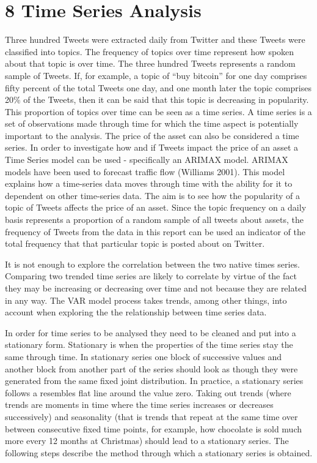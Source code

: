 \documentclass[
]{article}
\begin{document}
\hypertarget{time-series-analysis}{%
\section{8 Time Series Analysis}\label{time-series-analysis}}

Three hundred Tweets were extracted daily from Twitter and these Tweets
were classified into topics. The frequency of topics over time represent
how spoken about that topic is over time. The three hundred Tweets
represents a random sample of Tweets. If, for example, a topic of ``buy
bitcoin'' for one day comprises fifty percent of the total Tweets one
day, and one month later the topic comprises 20\% of the Tweets, then it
can be said that this topic is decreasing in popularity. This proportion
of topics over time can be seen as a time series. A time series is a set
of observations made through time for which the time aspect is
potentially important to the analysis. The price of the asset can also
be considered a time series. In order to investigate how and if Tweets
impact the price of an asset a Time Series model can be used -
specifically an ARIMAX model. ARIMAX models have been used to forecast
traffic flow (Williams 2001). This model explains how a time-series data
moves through time with the ability for it to dependent on other
time-series data. The aim is to see how the popularity of a topic of
Tweets affects the price of an asset. Since the topic frequency on a
daily basis represents a proportion of a random sample of all tweets
about assets, the frequency of Tweets from the data in this report can
be used an indicator of the total frequency that that particular topic
is posted about on Twitter.

It is not enough to explore the correlation between the two native times
series. Comparing two trended time series are likely to correlate by
virtue of the fact they may be increasing or decreasing over time and
not because they are related in any way. The VAR model process takes
trends, among other things, into account when exploring the the
relationship between time series data.

In order for time series to be analysed they need to be cleaned and put
into a stationary form. Stationary is when the properties of the time
series stay the same through time. In stationary series one block of
successive values and another block from another part of the series
should look as though they were generated from the same fixed joint
distribution. In practice, a stationary series follows a resembles flat
line around the value zero. Taking out trends (where trends are moments
in time where the time series increases or decreases successively) and
seasonality (that is trends that repeat at the same time over between
consecutive fixed time points, for example, how chocolate is sold much
more every 12 months at Christmas) should lead to a stationary series.
The following steps describe the method through which a stationary
series is obtained.
\end{document}
